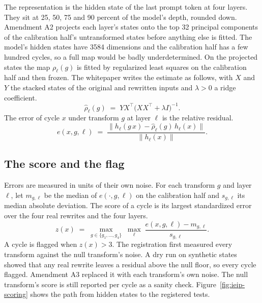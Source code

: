 The representation is the hidden state of the last prompt token at four layers.
They sit at 25, 50, 75 and 90 percent of the model's depth, rounded down.
Amendment A2 projects each layer's states onto the top 32 principal components of the
calibration half's untransformed states before anything else is fitted.
The model's hidden states have 3584 dimensions and the calibration half has a few hundred
cycles, so a full map would be badly underdetermined.
On the projected states the map $\rho_\ell(g)$ is fitted by regularized least squares on the
calibration half and then frozen.
The whitepaper writes the estimate as follows, with $X$ and $Y$ the stacked states of the
original and rewritten inputs and $\lambda > 0$ a ridge coefficient.
\begin{equation}
  \hat\rho_\ell(g) \;=\; Y X^{\top} \bigl( X X^{\top} + \lambda I \bigr)^{-1}.
\end{equation}
The error of cycle $x$ under transform $g$ at layer $\ell$ is the relative residual.
\begin{equation}
  e(x, g, \ell) \;=\; \frac{\bigl\lVert h_\ell(g\,x) - \hat\rho_\ell(g)\, h_\ell(x) \bigr\rVert}
  {\lVert h_\ell(x) \rVert}.
\end{equation}

\subsection{The score and the flag}

Errors are measured in units of their own noise.
For each transform $g$ and layer $\ell$, let $m_{g,\ell}$ be the median of $e(\cdot, g, \ell)$
on the calibration half and $s_{g,\ell}$ its median absolute deviation.
The score of a cycle is its largest standardized error over the four real rewrites and the
four layers.
\begin{equation}
  z(x) \;=\; \max_{g \in \{g_1, \dots, g_4\}} \; \max_{\ell} \;
  \frac{e(x, g, \ell) - m_{g,\ell}}{s_{g,\ell}}.
\end{equation}
A cycle is flagged when $z(x) > 3$.
The registration first measured every transform against the null transform's noise.
A dry run on synthetic states showed that any real rewrite leaves a residual above the null
floor, so every cycle flagged.
Amendment A3 replaced it with each transform's own noise.
The null transform's score is still reported per cycle as a sanity check.
Figure~\ref{fig:ieip-scoring} shows the path from hidden states to the registered tests.

